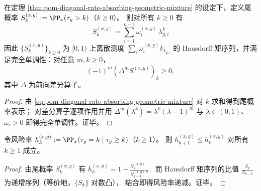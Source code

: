 \begin{corollary}\label{cor:pom-diagonal-rate-absorbing-hausdorff-moment-tail}
在定理 \ref{thm:pom-diagonal-rate-absorbing-geometric-mixture} 的设定下，定义尾概率
\(
S_k^{(x,y)}:=\PP_x(\tau_y>k)
\)（\(k\ge 0\)）。
则对所有 \(k\ge 0\) 有
\[
\boxed{\;
S_k^{(x,y)}=\sum_{i=1}^{n-1}\omega_i^{(x,y)}\,\lambda_{y,i}^{k}\;}
\]
因此 \(\{S_k^{(x,y)}\}_{k\ge 0}\) 为 \([0,1)\) 上离散测度 \(\sum_i\omega_i^{(x,y)}\delta_{\lambda_{y,i}}\) 的 Hausdorff 矩序列，并满足完全单调性：对任意 \(m,k\ge 0\)，
\[
(-1)^m(\Delta^m S^{(x,y)})_k\ge 0,
\]
其中 \(\Delta\) 为前向差分算子。
\end{corollary}
\begin{proof}
由 \eqref{eq:pom-diagonal-rate-absorbing-geometric-mixture} 对 \(k\) 求和得到尾概率表示；
对差分算子逐项作用并用
\(
\Delta^m(\lambda^k)=\lambda^k(\lambda-1)^m
\)
与 \(\lambda\in(0,1)\)、\(\omega_i>0\) 即得完全单调性。证毕。
\end{proof}

\begin{corollary}[递减风险率]\label{cor:pom-diagonal-rate-absorbing-dfr}
令风险率
\(
h_k^{(x,y)}:=\PP_x(\tau_y=k\mid \tau_y\ge k)
\)（\(k\ge 1\)）。
则 \(h_{k+1}^{(x,y)}\le h_k^{(x,y)}\) 对所有 \(k\ge 1\) 成立。
\end{corollary}
\begin{proof}
由尾概率 \(S_k^{(x,y)}\) 有 \(h_k^{(x,y)}=1-\frac{S_k^{(x,y)}}{S_{k-1}^{(x,y)}}\)。
而 Hausdorff 矩序列的比值 \(\frac{S_k}{S_{k-1}}\) 为递增序列（等价地，\(\{S_k\}\) 对数凸），
结合即得风险率递减。证毕。
\end{proof}

